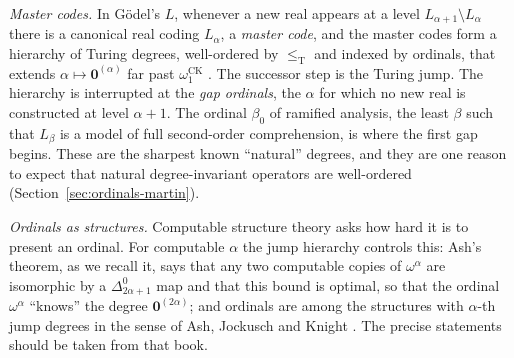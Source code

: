 \documentclass[11pt,a4paper]{article}
\newcommand{\leT}{\leq_{\mathrm T}}
\newcommand{\zero}{\mathbf0}
\theoremstyle{definition}\newtheorem{definition}[theorem]{Definition}
\theoremstyle{remark}\newtheorem{remark}[theorem]{Remark}
\begin{document}
\emph{Master codes.} In G\"odel's $L$, whenever a new real appears at a level $L_{\alpha+1}\setminus L_\alpha$ there is a canonical real coding $L_\alpha$, a \emph{master code}, and the master codes form a hierarchy of Turing degrees, well-ordered by $\leT$ and indexed by ordinals, that extends $\alpha\mapsto\zero^{(\alpha)}$ far past $\omega_1^{\mathrm{CK}}$ \cite{BoolosPutnam,Hodes}. The successor step is the Turing jump. The hierarchy is interrupted at the \emph{gap ordinals}, the $\alpha$ for which no new real is constructed at level $\alpha+1$. The ordinal $\beta_0$ of ramified analysis, the least $\beta$ such that $L_\beta$ is a model of full second-order comprehension, is where the first gap begins. These are the sharpest known ``natural'' degrees, and they are one reason to expect that natural degree-invariant operators are well-ordered (Section~\ref{sec:ordinals-martin}).

\emph{Ordinals as structures.} Computable structure theory asks how hard it is to present an ordinal. For computable $\alpha$ the jump hierarchy controls this: Ash's theorem, as we recall it, says that any two computable copies of $\omega^\alpha$ are isomorphic by a $\Delta^0_{2\alpha+1}$ map and that this bound is optimal, so that the ordinal $\omega^\alpha$ ``knows'' the degree $\zero^{(2\alpha)}$; and ordinals are among the structures with $\alpha$-th jump degrees in the sense of Ash, Jockusch and Knight \cite{AshKnight}. The precise statements should be taken from that book.
\end{document}
